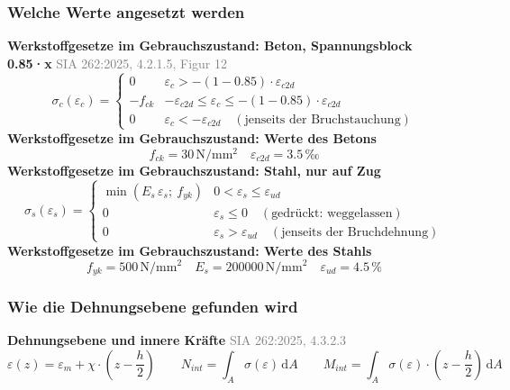 \documentclass[11pt,a4paper]{article}
\newcommand{\normref}[1]{{\small\textcolor{gray}{#1}}}
\begin{document}
\subsubsection{Welche Werte angesetzt werden}
\noindent\textbf{Werkstoffgesetze im Gebrauchszustand: Beton, Spannungsblock 0.85·x} \hfill \normref{SIA 262:2025, 4.2.1.5, Figur 12}
\begin{equation*}
\sigma_c(\varepsilon_c) = \begin{cases} 0 & \varepsilon_c > -(1 - 0.85) \cdot \varepsilon_{c2d} \\[1ex] -f_{ck} & -\varepsilon_{c2d} \le \varepsilon_c \le -(1 - 0.85) \cdot \varepsilon_{c2d} \\[1ex] 0 & \varepsilon_c < -\varepsilon_{c2d} \quad (\text{jenseits der Bruchstauchung}) \end{cases}
\end{equation*}
\noindent\textbf{Werkstoffgesetze im Gebrauchszustand: Werte des Betons}
\begin{equation*}
f_{ck} = 30\,\mathrm{N}/\mathrm{mm}^{2} \quad \varepsilon_{c2d} = 3.5\,\text{‰}
\end{equation*}
\noindent\textbf{Werkstoffgesetze im Gebrauchszustand: Stahl, nur auf Zug}
\begin{equation*}
\sigma_s(\varepsilon_s) = \begin{cases} \min(E_s\,\varepsilon_s;\ f_{yk}) & 0 < \varepsilon_s \le \varepsilon_{ud} \\[1ex] 0 & \varepsilon_s \le 0 \quad (\text{gedrückt: weggelassen}) \\[1ex] 0 & \varepsilon_s > \varepsilon_{ud} \quad (\text{jenseits der Bruchdehnung}) \end{cases}
\end{equation*}
\noindent\textbf{Werkstoffgesetze im Gebrauchszustand: Werte des Stahls}
\begin{equation*}
f_{yk} = 500\,\mathrm{N}/\mathrm{mm}^{2} \quad E_s = 200000\,\mathrm{N}/\mathrm{mm}^{2} \quad \varepsilon_{ud} = 4.5\,\%
\end{equation*}
\subsubsection{Wie die Dehnungsebene gefunden wird}
\noindent\textbf{Dehnungsebene und innere Kräfte} \hfill \normref{SIA 262:2025, 4.3.2.3}
\begin{equation*}
\varepsilon(z) = \varepsilon_m + \chi \cdot \left(z - \frac{h}{2}\right) \qquad N_{int} = \int_A \sigma\left(\varepsilon\right)\,\mathrm{d}A \qquad M_{int} = \int_A \sigma\left(\varepsilon\right) \cdot \left(z - \frac{h}{2}\right)\,\mathrm{d}A
\end{equation*}
\end{document}
